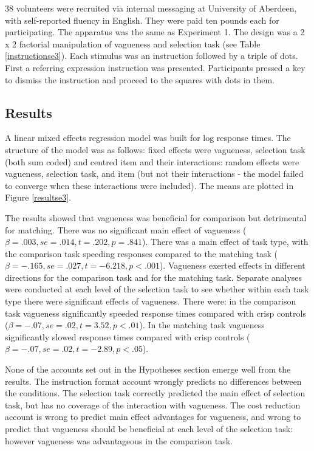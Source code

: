 \documentclass[graybox,envcountchap,sectrefs%
,footinfo
]{svmono}
\begin{document}
38 volunteers were recruited via internal messaging at University of Aberdeen, with self-reported fluency in English. They were paid ten pounds each for participating.
The apparatus was the same as Experiment 1.
The design was a 2 x 2 factorial manipulation of vagueness and selection task (see Table \ref{instructionse3}).
Each stimulus was an instruction followed by a triple of dots.
First a referring expression instruction was presented. Participants pressed a key to dismiss the instruction and proceed to the squares with dots in them.

\subsection{Results}
A linear mixed effects regression model was built for log response times. The structure of the model was as follows: fixed effects were vagueness, selection task (both sum coded) and centred item and their interactions: random effects were vagueness, selection task, and item (but not their interactions - the model failed to converge when these interactions were included). The means are plotted in Figure \ref{resultse3}.

The results showed that vagueness was beneficial for comparison but detrimental for matching. There was no significant main effect of vagueness ($\beta =.003, se=.014, t=.202, p=.841$). There was a main effect of task type, with the comparison task speeding responses compared to the matching task ($\beta=-.165, se=.027, t=-6.218, p<.001$). Vagueness exerted effects in different directions for the comparison task and for the matching task. Separate analyses were conducted at each level of the selection task to see whether within each task type there were significant effects of vagueness. There were: in the comparison task vagueness significantly speeded response times compared with crisp controls ($\beta=-.07, se=.02, t=3.52, p<.01$). In the matching task vagueness significantly slowed response times compared with crisp controls ($\beta=-.07, se=.02, t=-2.89, p<.05$).

None of the accounts set out in the Hypotheses section emerge well from the results. The instruction format account wrongly predicts no differences between the conditions. The selection task correctly predicted the main effect of selection task, but has no coverage of the interaction with vagueness. The cost reduction account is wrong to predict main effect advantages for vagueness, and wrong to predict that vagueness should be beneficial at each level of the selection task: however vagueness was advantageous in the comparison task.
\end{document}
